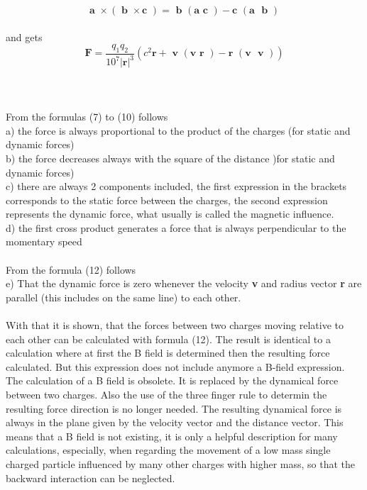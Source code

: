 \documentclass[10pt,titlepage]{article}
\begin{document}
\begin{equation}
\textbf{a }\times (\textbf{ b } \times  \textbf{c })=\textbf{ b }(\textbf{a }\textbf{c }) - \textbf{c }(\textbf{a }\textbf{ b })
\end{equation}\\
and gets
\begin{equation}
\textbf{F} = \frac{q_1q_2}{10^7\vert\textbf{r}\vert^3}  (c^2\textbf{r}  +   \textbf{ v }(\textbf{v }\textbf{r }) - \textbf{r }(\textbf{v }\textbf{ v }))
\end{equation}\\
\\
\\
From the formulas (7) to (10) follows
\\a) the force is always proportional to the product of the charges (for static and dynamic forces)
\\b) the force decreases always with the square of the distance )for static and dynamic forces)
\\c) there are always 2 components included, the first expression in the brackets corresponds to the static force between the charges, the second expression represents the dynamic force, what usually is called the magnetic influence.  
\\d) the first cross product generates a force that is always perpendicular to the momentary speed
\\
\\
From the formula (12) follows
\\e) That the dynamic force is zero whenever the velocity \textbf{v } and radius vector \textbf{r } are parallel (this includes on the same line) to each other.
\\
\\
With that it is shown, that the forces between two charges moving relative to each other can be calculated with formula (12). The result is identical to a calculation where at first the B field is determined then  the resulting force calculated.
But this expression does not include anymore a B-field expression. The calculation of a B field is obsolete.
It is replaced by the dynamical force between two charges.
Also the use of the three finger rule to determin the resulting force direction is no longer needed. The resulting dynamical force is always in the plane given by the velocity vector and the distance vector.
This means that a B field is not existing, it is only a helpful description for many calculations, especially, when regarding the movement of a low mass single charged particle influenced by many other charges with higher mass, so that the backward interaction can be neglected.
\end{document}
